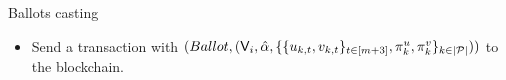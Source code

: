 \begin{boxfig}{\label{fig:private_vote}Ballots casting}{}
\begin{itemize}
\begin{itemize}
\begin{itemize}
			    \item pick randomness $r_{k,1},\ldots, r_{k,m+3}\leftarrow \ZZ_q$ and compute $u_{k,t}\leftarrow \Enc_{\pk}(e_t; r_{k,t})$, $t\in[m+3]$, where $e_t$ is a $t$-th bit of the vector $e^{(m+3)}_{k,l}$;
			    \item produce a proof $\pi_k^u$ showing that $\{u_{k,t}\}_{t\in[m+3]}$ encrypts a unit vector (see [\ref{fig:unit_zk_prover}]);
			    \item pick randomness $r_{k,\alpha}\leftarrow \ZZ_q$ and compute $\hat\alpha=\Enc_{\pk}(\alpha,r_{k,\alpha})$, where $\alpha$ is an amount of stake of a voter;
			    \item pick randomness $z_{k,1},\ldots, z_{k,m+3}\leftarrow \ZZ_q$ and compute $v_{k,t}\leftarrow \hat\alpha^{e_{t}} \cdot \Enc_{\pk}(0;z_{k,t})$, $t\in[m+3]$, where $e_{t}$ is a $t$-th bit of the vector $e^{(m+3)}_{k,l}$;
			    \item produce a proof $\pi_k^v$ showing that $\{v_{k,t}\}_{t\in[m+3]}$ is in correct relation to $\{u_{k,t}\}_{t\in[m+3]}$ and $\hat\alpha$ (see [\ref{fig:MultRelationNIZK}]);
			\end{itemize}
			  
			\item Send a transaction with $(Ballot, (\mathsf{V}_i, \hat\alpha,\{\{u_{k,t},v_{k,t}\}_{t\in[m+3]}, \pi_k^u, \pi_k^v\}_{k \in |\mathcal{P}|}))$ to the blockchain.
		\end{itemize}	
	\end{itemize}
\end{boxfig}

